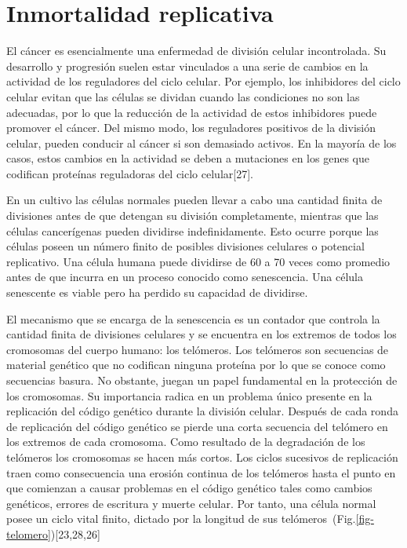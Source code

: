 \section{Inmortalidad replicativa}
\hspace{.1cm}El cáncer es esencialmente una enfermedad de división celular incontrolada. Su desarrollo y progresión suelen estar vinculados a una serie de cambios en la actividad de los reguladores del ciclo celular. Por ejemplo, los inhibidores del ciclo celular evitan que las células se dividan cuando las condiciones no son las adecuadas, por lo que la reducción de la actividad de estos inhibidores puede promover el cáncer. Del mismo modo, los reguladores positivos de la división celular, pueden conducir al cáncer si son demasiado activos. En la mayoría de los casos, estos cambios en la actividad se deben a mutaciones en los genes que codifican proteínas reguladoras del ciclo celular[27].

\hspace{.1cm}En un cultivo las células normales pueden llevar a cabo una cantidad finita de divisiones antes de que detengan su división completamente, mientras que las células cancerígenas pueden dividirse indefinidamente. Esto ocurre porque las células poseen un número finito de posibles divisiones celulares o potencial replicativo. Una célula humana puede dividirse de 60 a 70 veces como promedio antes de que incurra en un proceso conocido como senescencia. Una célula senescente es viable pero ha perdido su capacidad de dividirse.

\hspace{.1cm}El mecanismo que se encarga de la senescencia es un contador que controla la cantidad finita de divisiones celulares y se encuentra en los extremos de todos los cromosomas del cuerpo humano: los telómeros. Los telómeros son secuencias de material genético que no codifican ninguna proteína por lo que se conoce como secuencias basura. No obstante, juegan un papel fundamental en la protección de los cromosomas. Su importancia radica en un problema único presente en la replicación del código genético durante la división celular. Después de cada ronda de replicación del código genético se pierde una corta secuencia del telómero en los extremos de cada cromosoma. Como resultado de la degradación de los telómeros los cromosomas se hacen más cortos. Los ciclos sucesivos de replicación traen como consecuencia una erosión continua de los telómeros hasta el punto en que comienzan a causar problemas en el código genético tales como cambios genéticos, errores de escritura y muerte celular. Por tanto, una célula normal posee un ciclo vital finito, dictado por la longitud de sus telómeros~(Fig.\ref{fig-telomero})[23,28,26]

